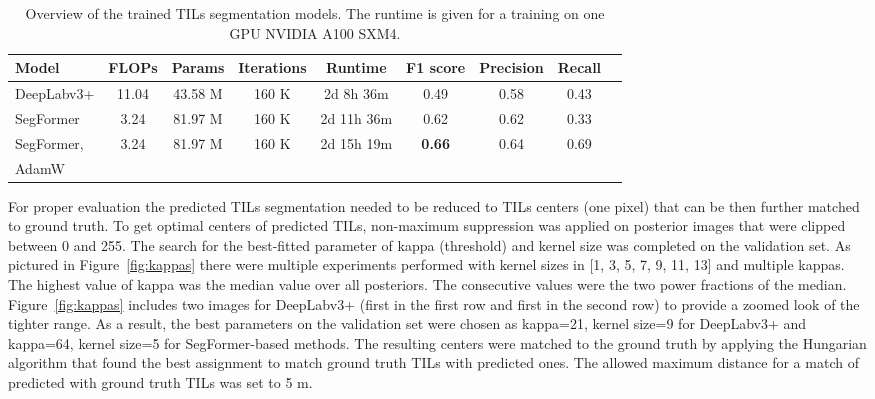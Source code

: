 \begin{table}[h!]
    \centering
    \begin{tabular}{ l c c c c c c c c}
        \hline
        Model & FLOPs & Params & Iterations & Runtime & F1 score & Precision & Recall\\
        \hline
        DeepLabv3+ & 11.04 & 43.58 M & 160 K & 2d 8h 36m & 0.49 & 0.58 & 0.43\\
        SegFormer & 3.24 & 81.97 M & 160 K  & 2d 11h 36m & 0.62 & 0.62 & 0.33\\
        SegFormer, & \multirow{2}{*}{3.24} & \multirow{2}{*}{81.97 M} & \multirow{2}{*}{160 K} & \multirow{2}{*}{2d 15h 19m} & \multirow{2}{*}{\textbf{0.66}} & \multirow{2}{*}{0.64} & \multirow{2}{*}{0.69}\\
        AdamW & & & & & & & & \\
        \hline
    \end{tabular}
\caption{\label{tab:tils_perform} Overview of the trained TILs segmentation models. The runtime is given for a training on one GPU NVIDIA A100 SXM4.}
\end{table}

For proper evaluation the predicted TILs segmentation needed to be reduced to TILs
centers (one pixel) that can be then further matched to ground truth.
To get optimal centers of predicted TILs, non-maximum suppression was applied on
posterior images that were clipped between 0 and 255. The search for the best-fitted
parameter of kappa (threshold) and kernel size was completed on the validation set.
As pictured in Figure~\ref*{fig:kappas} there were multiple experiments performed
with kernel sizes  in [1, 3, 5, 7, 9, 11, 13] and multiple kappas. The highest value of
kappa was the median value over all posteriors. The consecutive values were the
two power fractions of the median. Figure~\ref*{fig:kappas} includes two images
for DeepLabv3+ (first in the first row and first in the second row) to provide a
zoomed look of the tighter range. As a result, the best parameters on the validation
set were chosen as kappa=21, kernel size=9 for DeepLabv3+ and kappa=64, kernel size=5
for SegFormer-based methods. The resulting centers were matched to
the ground truth by applying the Hungarian algorithm that found the best assignment
to match ground truth TILs with predicted ones. The allowed maximum distance for a
match of predicted with ground truth TILs was set to 5 \textmu m.

